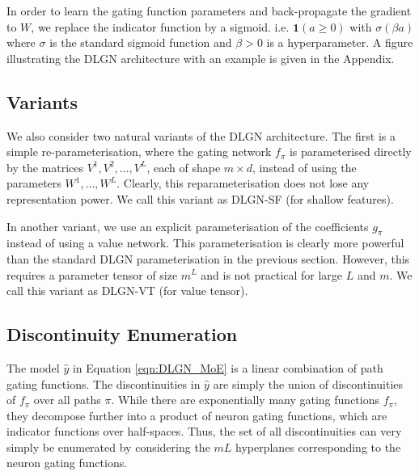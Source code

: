 \documentclass{article} %
\renewcommand{\>}{{\rightarrow}}
\renewcommand{\=}{\stackrel{\triangle}{=}}
\newcommand{\0}{{\mathbf 0}}
\newcommand{\boldeta}{{\boldsymbol \eta}}
\begin{document}
In order to learn the gating function parameters and back-propagate the gradient to $W$, we replace the indicator function by a sigmoid. i.e. $\mathbf{1}(a\geq 0)$ with $\sigma(\beta a)$ where $\sigma$ is the standard sigmoid function and $\beta>0$ is a hyperparameter. A figure illustrating the DLGN architecture with an example is given in the Appendix.  

\subsection{Variants}
We also consider two natural variants of the DLGN architecture. The first is a simple re-parameterisation, where the gating network $f_\pi$ is parameterised directly by the matrices $V^1, V^2, \ldots, V^L$, each of shape $m \times d$, instead of using the parameters $W^1, \ldots, W^L$. Clearly, this reparameterisation does not lose any representation power. We call this variant as DLGN-SF (for shallow features). 

In another variant, we use an explicit parameterisation of the coefficients $g_\pi$ instead of using a value network. This parameterisation is  clearly more powerful than the standard DLGN parameterisation in the previous section. However, this requires a parameter tensor of size $m^L$ and is not practical for large $L$ and $m$. We call this variant as DLGN-VT (for value tensor). 


\subsection{Discontinuity Enumeration}

The model $\widehat y$ in Equation \eqref{eqn:DLGN_MoE} is a linear combination of path gating functions. The discontinuities in $\widehat y$ are simply the union of discontinuities of $f_\pi$ over all paths $\pi$. While there are exponentially many gating functions $f_\pi$, they decompose further into a product of neuron gating functions, which are indicator functions over half-spaces. Thus, the set of all discontinuities can very simply be enumerated by considering the $m L$ hyperplanes corresponding to the neuron gating functions.

\end{document}
